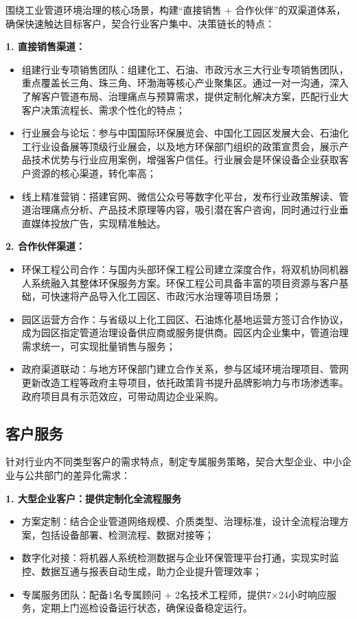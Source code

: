\documentclass[12pt, a4paper]{article}
\begin{document}
围绕工业管道环境治理的核心场景，构建“直接销售 + 合作伙伴”的双渠道体系，确保快速触达目标客户，契合行业客户集中、决策链长的特点：

\textbf{1. 直接销售渠道：}

\begin{itemize}
    \item 组建行业专项销售团队：组建化工、石油、市政污水三大行业专项销售团队，重点覆盖长三角、珠三角、环渤海等核心产业聚集区。通过一对一沟通，深入了解客户管道布局、治理痛点与预算需求，提供定制化解决方案，匹配行业大客户决策流程长、需求个性化的特点；
    \item 行业展会与论坛：参与中国国际环保展览会、中国化工园区发展大会、石油化工行业设备展等顶级行业展会，以及地方环保部门组织的政策宣贯会，展示产品技术优势与行业应用案例，增强客户信任。行业展会是环保设备企业获取客户资源的核心渠道，转化率高；
    \item 线上精准营销：搭建官网、微信公众号等数字化平台，发布行业政策解读、管道治理痛点分析、产品技术原理等内容，吸引潜在客户咨询，同时通过行业垂直媒体投放广告，实现精准触达。
\end{itemize}

\textbf{2. 合作伙伴渠道：}

\begin{itemize}
    \item 环保工程公司合作：与国内头部环保工程公司建立深度合作，将双机协同机器人系统融入其整体环保服务方案。环保工程公司具备丰富的项目资源与客户基础，可快速将产品导入化工园区、市政污水治理等项目场景；
    \item 园区运营方合作：与省级以上化工园区、石油炼化基地运营方签订合作协议，成为园区指定管道治理设备供应商或服务提供商。园区内企业集中，管道治理需求统一，可实现批量销售与服务；
    \item 政府渠道联动：与地方环保部门建立合作关系，参与区域环境治理项目、管网更新改造工程等政府主导项目，依托政策背书提升品牌影响力与市场渗透率。政府项目具有示范效应，可带动周边企业采购。
\end{itemize}

\subsection{客户服务}

针对行业内不同类型客户的需求特点，制定专属服务策略，契合大型企业、中小企业与公共部门的差异化需求：

\textbf{1. 大型企业客户：提供定制化全流程服务}

\begin{itemize}
    \item 方案定制：结合企业管道网络规模、介质类型、治理标准，设计全流程治理方案，包括设备部署、检测流程、数据对接等；
    \item 数字化对接：将机器人系统检测数据与企业环保管理平台打通，实现实时监控、数据互通与报表自动生成，助力企业提升管理效率；
    \item 专属服务团队：配备1名专属顾问 + 2名技术工程师，提供7×24小时响应服务，定期上门巡检设备运行状态，确保设备稳定运行。
\end{itemize}
\end{document}
